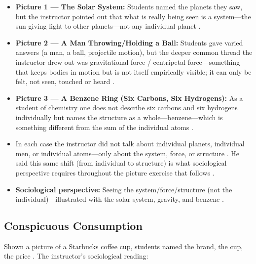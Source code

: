 \begin{ExampleBox}
\begin{itemize}
    \item \textbf{Picture 1 --- The Solar System:} Students named the planets they saw, but the instructor pointed out that what is really being seen is a system---the sun giving light to other planets---not any individual planet .
    \item \textbf{Picture 2 --- A Man Throwing/Holding a Ball:} Students gave varied answers (a man, a ball, projectile motion), but the deeper common thread the instructor drew out was gravitational force / centripetal force---something that keeps bodies in motion but is not itself empirically visible; it can only be felt, not seen, touched or heard .
    \item \textbf{Picture 3 --- A Benzene Ring (Six Carbons, Six Hydrogens):} As a student of chemistry one does not describe six carbons and six hydrogens individually but names the structure as a whole---benzene---which is something different from the sum of the individual atoms .
\end{itemize}
\end{ExampleBox}

\begin{CriticalPoint}
\begin{itemize}
    \item In each case the instructor did not talk about individual planets, individual men, or individual atoms---only about the system, force, or structure . He said this same shift (from individual to structure) is what sociological perspective requires throughout the picture exercise that follows .
\end{itemize}
\end{CriticalPoint}

\begin{QuickRevision}
\begin{itemize}
    \item \textbf{Sociological perspective:} Seeing the system/force/structure (not the individual)---illustrated with the solar system, gravity, and benzene .
\end{itemize}
\end{QuickRevision}

\subsection{Conspicuous Consumption}
Shown a picture of a Starbucks coffee cup, students named the brand, the cup, the price . The instructor's sociological reading:

